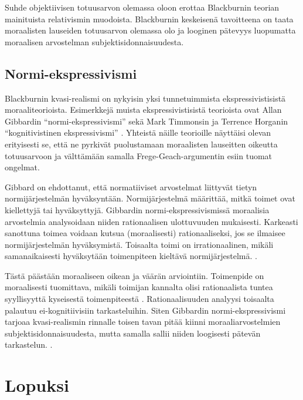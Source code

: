 \documentclass[a4paper,12pt,times,titlepage,finnish]{article}
\begin{document}
Suhde objektiivisen totuusarvon olemassa oloon erottaa Blackburnin teorian mainituista relativismin muodoista. Blackburnin keskeisenä tavoitteena on taata moraalisten lauseiden totuusarvon olemassa olo ja looginen pätevyys luopumatta moraalisen arvostelman subjektisidonnaisuudesta. 


\subsection{Normi-ekspressivismi}

Blackburnin kvasi-\-realismi on nykyisin yksi tunnetuimmista ekspressivistisistä moraaliteorioista. Esimerkkejä muista ekspressivistisistä teorioista ovat Allan Gibbardin “normi-\-ekspressivismi” \citep[ks.][]{Gibbard90} sekä Mark Timmonsin ja Terrence Horganin “kognitivistinen ekspressivismi” \citep{Horgan06}. Yh\-teis\-tä näille teorioille näyttäisi olevan erityisesti se, että ne pyr\-ki\-vät puolustamaan moraalisten lauseitten oikeutta totuusarvoon ja välttämään samalla Frege-Geach-argumentin esiin tuomat ongelmat. \citep{cognitivismSE}

Gibbard on ehdottanut, että normatiiviset arvostelmat liittyvät tietyn nor\-mi\-jär\-jes\-tel\-män hyväksyntään. Nor\-mi\-jär\-jes\-tel\-mä määrittää, mitkä toimet ovat kiellettyjä tai hy\-väk\-syt\-ty\-jä. Gibbardin normi-\-ekspressivismissä moraalisia arvostelmia analysoidaan niiden rationaalisen ulottuvuuden mukaisesti. Karkeasti sanottuna toimea voidaan kutsua (moraalisesti) rationaaliseksi, jos se ilmaisee nor\-mi\-jär\-jes\-tel\-män hyväksymistä. Toisaalta toimi on irrationaalinen, mikäli samanaikaisesti hyväksytään toimenpiteen kieltävä nor\-mi\-jär\-jes\-tel\-mä. \citep[46]{Gibbard90}. 

Tästä päästään moraaliseen oikean ja väärän arviointiin. Toimenpide on moraalisesti tuomittava, mikäli toimijan kannalta olisi rationaalista tuntea syyllisyyttä kyseisestä toimenpiteestä \citep[45]{Gibbard90}. Rationaalisuuden analyysi toisaalta palautuu ei-kognitiivisiin tarkasteluihin. Siten Gibbardin normi-\-ekspressivismi tarjoaa kvasi-\-realismin rinnalle toisen tavan pitää kiinni moraaliarvostelmien subjektisidonnaisuudesta, mutta samalla sallii niiden loogisesti pätevän tarkastelun. \citep{cognitivismSE}.


\section{Lopuksi}
\end{document}
